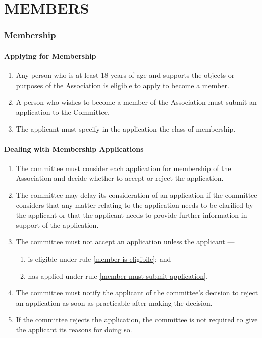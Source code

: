 \documentclass[../constitution.tex]{subfiles}
\begin{document}
\part{MEMBERS} \label{part-3-members}


\section{Membership} \label{division-1-membership}


\subsection{Applying for Membership} \label{applying-for-membership}

\begin{enumerate}
\item Any person who is at least 18 years of age and supports the objects or purposes of the Association is eligible to apply to become a member. \label{member-is-eligibile}
\item A person who wishes to become a member of the Association must submit an application to the Committee. \label{member-must-submit-application}
\item The applicant must specify in the application the class of membership.
\end{enumerate}


\subsection{Dealing with Membership Applications}\label{dealing-with-membership-applications}

\begin{enumerate}
\item The committee must consider each application for membership of the Association and decide whether to accept or reject the application.
\item The committee may delay its consideration of an application if the committee considers that any matter relating to the application needs to be clarified by the applicant or that the applicant needs to provide further information in support of the application.
\item The committee must not accept an application unless the applicant ---
  \begin{enumerate}
  \item is eligible under rule \ref{member-is-eligibile}; and
  \item has applied under rule \ref{member-must-submit-application}.
  \end{enumerate}
\item The committee must notify the applicant of the committee's decision to reject an application as soon as practicable after making the decision.
\item If the committee rejects the application, the committee is not required to give the applicant its reasons for doing so.
\end{enumerate}
\end{document}
